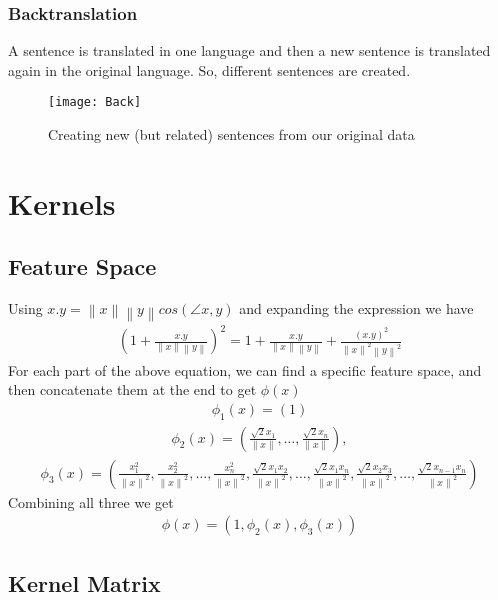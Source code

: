 \documentclass[12pt,onecolumn,a4paper]{article}
\newcommand{\norm}[1]{\left\lVert#1\right\rVert}
\begin{document}
\subsubsection{Backtranslation}
A sentence is translated in one language and then a new sentence is translated again in the original language. So, different sentences are created.
\begin{figure}[H]
	\centering
	\texttt{[image: Back]}
	\caption{Creating new (but related) sentences from our original data}
\end{figure}
\section{Kernels}
\subsection{Feature Space}
Using $x.y = \norm{x}\norm{y} cos(\angle x,y)$ and expanding the expression we have
\begin{align*}
	(1 + \frac{x.y} {\norm{x}\norm{y}})^2 = 1 + \frac{x.y}{\norm{x}\norm{y}} + \frac{(x.y)^2}{\norm{x}^2 \norm{y}^2}
\end{align*}
For each part of the above equation, we can find a specific feature space, and then concatenate them at the end to get $\phi(x)$
\begin{align*}
	\phi_{1}(x) = (1)
\end{align*}
\begin{align*}
	\phi_{2}(x) = (\frac{\sqrt{2} x_1}{\norm{x}},\dots, \frac{\sqrt{2}x_n}{\norm{x}}),
\end{align*}
\begin{align*}
	\phi_{3}(x) =  (\frac{x_1^2}{\norm{x}^2}, \frac{x_2^2}{\norm{x}^2},\dots, \frac{x_n^2}{\norm{x}^2}, \frac{\sqrt{2} x_1 x_2}{\norm{x}^2},\dots, \frac{\sqrt{2} x_{1} x_{n}}{\norm{x}^2},\frac{\sqrt{2} x_{2} x_{3}}{\norm{x}^2},  \dots,  \frac{\sqrt{2} x_{n - 1} x_{n}}{\norm{x}^2})
\end{align*}
Combining all three we get
\begin{align*}
	\phi(x) = (1, \phi_2(x), \phi_3(x))
\end{align*}
\subsection{Kernel Matrix}
\end{document}
